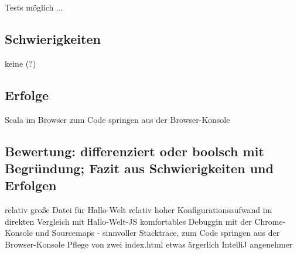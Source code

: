\documentclass[a4paper, 12pt, hidelinks, listof=totoc, listoftables=totoc, bibliography=totoc]{scrreprt}
\begin{document}

Tests möglich ...


\subsection{Schwierigkeiten}
keine (?)
\subsection{Erfolge}
Scala im Browser
zum Code springen aus der Browser-Konsole
\subsection{Bewertung: differenziert oder boolsch mit Begründung; Fazit aus Schwierigkeiten und Erfolgen}
relativ große Datei für Hallo-Welt
relativ hoher Konfigurationsaufwand im direkten Vergleich mit Hallo-Welt-JS
komfortables Debuggin mit der Chrome-Konsole und Sourcemaps - sinnvoller Stacktrace, zum Code springen aus der Browser-Konsole
Pflege von zwei index.html etwas ärgerlich
IntelliJ angenehmer
\end{document}
